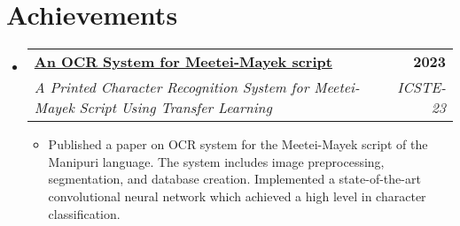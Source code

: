 \documentclass[letterpaper,11pt]{article}
\makeatletter
\newcommand{\resumeItem}[1]{
  \item\small{
    {#1 \vspace{-2pt}}
  }
}
\newcommand{\resumeSubheading}[4]{
  \vspace{-2pt}\item
    \begin{tabular*}{1.0\textwidth}[t]{l@{\extracolsep{\fill}}r}
      \textbf{#1} & \textbf{\small #2} \\
      \textit{\small#3} & \textit{\small #4} \\
    \end{tabular*}\vspace{-7pt}
}
\newcommand{\resumeSubHeadingListStart}{\begin{itemize}[leftmargin=0.0in, label={}]}
\newcommand{\resumeSubHeadingListEnd}{\end{itemize}}
\newcommand{\resumeItemListStart}{\begin{itemize}}
\newcommand{\resumeItemListEnd}{\end{itemize}\vspace{-5pt}}
\makeatother
\begin{document}
\section{Achievements}
\resumeSubHeadingListStart
\resumeSubheading{\href{https://link.springer.com/chapter/10.1007/978-981-99-4713-3_50}{An OCR System for Meetei-Mayek script}}{2023}{A Printed Character Recognition System for Meetei-Mayek Script Using Transfer Learning}{ICSTE-23}
\resumeItemListStart
\resumeItem{Published a paper on OCR system for the Meetei-Mayek script of the Manipuri language. The system includes image preprocessing, segmentation, and database creation. Implemented a state-of-the-art convolutional neural network which achieved a high level in character classification.}
\resumeItemListEnd

\resumeSubHeadingListEnd
\end{document}
